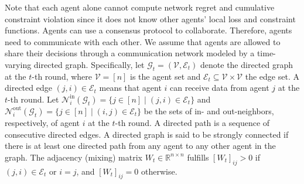 \documentclass[12pt,draftcls,onecolumn]{IEEEtran}%
\DeclareMathOperator{\inout}{in}
\DeclareMathOperator{\outin}{out}
\begin{document}
Note that each agent alone cannot compute network regret and cumulative constraint violation since it does not know other agents' local loss and constraint functions. Agents can use a consensus protocol to collaborate. Therefore, agents need to communicate with each other. We assume that agents are allowed to share their decisions through a communication network modeled by a time-varying directed graph. Specifically, let $\mathcal{G}_t=(\mathcal{V},\mathcal{E}_t)$ denote the directed graph at the $t$-th round, where $\mathcal{V}=[n]$ is the agent set and $\mathcal{E}_t\subseteq\mathcal{V}\times\mathcal{V}$ the edge set. A directed edge $(j,i)\in\mathcal{E}_t$ means that agent $i$ can receive data from agent $j$ at the $t$-th round. Let $\mathcal{N}^{\inout}_i(\mathcal{G}_t)=\{j\in [n]\mid (j,i)\in\mathcal{E}_t\}$ and $\mathcal{N}^{\outin}_i(\mathcal{G}_t)=\{j\in [n]\mid (i,j)\in\mathcal{E}_t\}$ be the sets of in- and out-neighbors, respectively, of agent $i$ at the $t$-th round. A directed path is a sequence of consecutive directed edges. A  directed graph is said to be strongly connected if there is at least one directed path
from any agent to any other agent in the graph. The adjacency (mixing) matrix $W_t\in\mathbb{R}^{n\times n}$  fulfills $[W_t]_{ij}>0$ if $(j,i)\in\mathcal{E}_t$ or $i=j$, and $[W_t]_{ij}=0$ otherwise.
\end{document}
